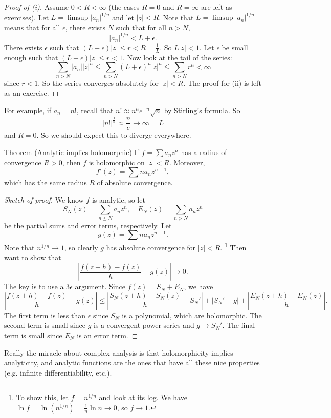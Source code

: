 \begin{proof}[Proof of (i)]
  Assume $0 < R < \infty$ (the cases $R = 0$ and
  $R = \infty$ are left as exercises). Let
  $L = \limsup |a_n|^{1 / n}$ and let $|z| < R$.
  Note that $L = \limsup |a_n|^{1 / n}$ means that for
  all $\epsilon$, there exists $N$ such that
  for all $n > N$,
  \[
    |a_n|^{1 / n} < L + \epsilon
  .\]
  There exists $\epsilon$ such that
  $(L + \epsilon)|z| \le r < R = \frac{1}{L}$.
  So $L|z| < 1$. Let $\epsilon$ be small enough such
  that $(L + \epsilon)|z| \le r < 1$.
  Now look at the tail of the series:
  \[
    \sum_{n > N} |a_n| |z|^n
    \le \sum_{n > N} (L + \epsilon)^n |z|^n
    \le \sum_{n > N} r^n < \infty
  \]
  since $r < 1$. So the series converges absolutely
  for $|z| < R$.
  The proof for (ii) is left as an exercise.
\end{proof}

For example, if $a_n = n!$, recall that
$n! \approx n^n e^{-n} \sqrt{n}$ by Stirling's formula.
So
\[
  \left|n!\right|^{\frac{1}{n}}
  \approx \frac{n}{e} \to \infty = L
\]
and $R = 0$. So we should expect this to diverge
everywhere.

\begin{thm}{Theorem (Analytic implies holomorphic)}
  If $f = \sum a_n z^n$ has a radius of convergence
  $R > 0$, then $f$ is holomorphic on $|z| < R$.
  Moreover,
  \[
    f'(z) = \sum n a_n z^{n - 1}
  ,\]
  which has the same radius $R$ of absolute convergence.
\end{thm}

\begin{proof}[Sketch of proof]
  We know $f$ is analytic, so let
  \[S_N(z) = \sum_{n \le N} a_n z^n, \quad E_N(z) = \sum_{n > N} a_n z^n\]
  be the partial sums and error terms, respectively.
  Let
  \[
    g(z) = \sum n a_n z^{n - 1}
  .\]
  Note that $n^{1 / n} \to 1$, so clearly $g$ has
  absolute convergence for $|z| < R$.
  \footnote{
    To show this, let $f = n^{1 / n}$ and look at
    its log. We have
    $\ln f = \ln(n^{1 / n}) = \frac{1}{n} \ln n \to 0$,
    so $f \to 1$.
  }
  Then want to
  show that
  \[
    \left|\frac{f(z + h) - f(z)}{h} - g(z)\right| \to 0
  .\]
  The key is to use a $3\epsilon$ argument.
  Since $f(z) = S_N + E_N$, we have
  \[
    \left|\frac{f(z + h) - f(z)}{h} - g(z)\right|
    \le \left|\frac{S_N(z + h) - S_N(z)}{h} - S_N'\right|
    + |S_N' - g| + \left|\frac{E_N(z + h) - E_N(z)}{h}\right|
  .\]
  The first term is less than $\epsilon$ since
  $S_N$ is a polynomial, which are holomorphic.
  The second term is small since $g$ is a convergent
  power series and $g \to S_N'$. The final term is
  small since $E_N$ is an error term.
\end{proof}

\begin{remark}
  Really the miracle about complex analysis is
  that holomorphicity implies analyticity, and analytic
  functions are the ones that have all these nice
  properties (e.g. infinite differentiability, etc.).
\end{remark}
